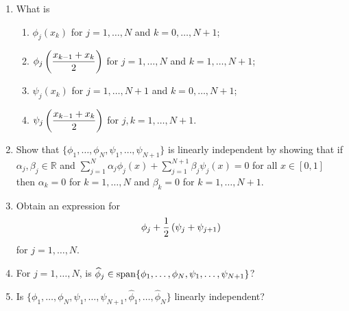 \begin{enumerate}
\item What is
\begin{enumerate}
\item $\displaystyle{\phi_j\left(x_k\right)}$ for $j=1,\ldots,N$ and $k=0,\ldots,N+1$;

\item $\displaystyle{\phi_j\left({x_{k-1}+x_k \over 2}\right)}$ for $j=1,\ldots,N$ and $k=1,\ldots,N+1$;

\item $\displaystyle{\psi_j\left(x_k\right)}$ for $j=1,\ldots,N+1$ and $k=0,\ldots,N+1$;

\item $\displaystyle{\psi_j\left({x_{k-1}+x_k \over 2}\right)}$ for $j,k=1,\ldots,N+1$.
\end{enumerate}

\vspace*{1em}
\item Show that $\{\phi_1,\ldots,\phi_N,\psi_1,\ldots,\psi_{N+1}\}$ is linearly independent by showing that if $\alpha_j,\beta_j\in\mathbb{R}$ and $\displaystyle{\sum_{j=1}^N\alpha_j\phi_j(x)+\sum_{j=1}^{N+1}\beta_j\psi_j(x)=0}$ for all $x\in[0,1]$ then $\alpha_k=0$ for $k=1,\ldots,N$ and $\beta_k=0$ for $k=1,\ldots,N+1$.

\vspace*{1em}
\item Obtain an expression for
\[
\phi_j+{1 \over 2}\left(\psi_j+\psi_{j+1}\right)
\]
for $j=1,\ldots,N$.

\vspace*{1em}
\item For $j=1,\ldots,N$, is $\widehat{\phi}_j\in{\rm span}\{\phi_1,\ldots,\phi_N,\psi_1,\ldots,\psi_{N+1}\}$?

\vspace*{1em}
\item Is $\{\phi_1,\ldots,\phi_N,\psi_1,\ldots,\psi_{N+1},\widehat{\phi}_1,\ldots,\widehat{\phi}_N\}$ linearly independent?

\end{enumerate}


